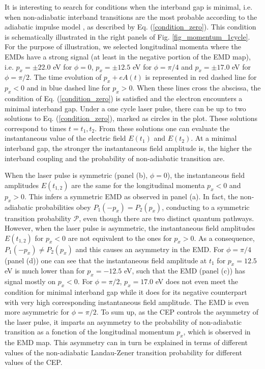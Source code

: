 \documentclass[9pt,twocolumn,twoside]{osajnl}
\begin{document}
It is interesting to search for conditions when the interband gap is minimal, i.e. when non-adiabatic interband transitions are the most probable according to the adiabatic impulse model \cite{PhysRevB.94.125423}, as described by Eq. (\ref{condition_zero}).
This condition is schematically illustrated in the right panels of Fig. \ref{fig_momentum_1cycle}. For the purpose of illustration, we selected longitudinal momenta where the EMDs have a strong signal (at least in the negative portion of the EMD map), i.e.  $p_x=\pm22.0$ eV for $\phi=0$, $p_x=\pm12.5$ eV for $\phi=\pi/4$ and $p_x=\pm17.0$ eV for $\phi=\pi/2$. The  time evolution of  $p_x + e A(t)$ is represented  in red dashed line for $p_x<0$ and in blue dashed line for $p_x>0$.  When these lines cross the abscissa, the condition of Eq. (\ref{condition_zero}) is satisfied and the electron encounters a minimal interband gap. Under a one cycle laser pulse, there can be up to two solutions to Eq. (\ref{condition_zero}), marked as circles in the plot. These solutions correspond to times $t=t_1,t_2$. From these solutions one can evaluate the instantaneous value of the electric field $E(t_1)$ and $E(t_2)$. At a minimal interband gap, the stronger the instantaneous field amplitude is, the higher the interband coupling  and  the probability of non-adiabatic transition are. 

When the laser pulse is symmetric (panel (b), $\phi=0$), the instantaneous field amplitudes $E(t_{1,2})$ are the same for the longitudinal momenta $p_x<0$ and $p_x>0$. This infers a symmetric EMD as observed in panel (a). In fact,  the non-adiabatic probabilities  obey $P_{1}(-p_{x}) = P_{2}(p_{x})$,  conducting to a symmetric transition probability $\mathcal{P}$, even though there are two distinct quantum pathways.
However, when the laser pulse is asymmetric, the instantaneous field amplitudes $E(t_{1,2})$ for $p_x<0$ are not equivalent to the ones for $p_x>0$. As a consequence, $P_{1}(-p_{x}) \neq P_{2}(p_{x})$ and this causes an asymmetry in the EMD. For $\phi=\pi/4$ (panel (d)) one can see that the instantaneous field amplitude at $t_{1}$ for $p_x=12.5$ eV  is much lower than for $p_x=-12.5$ eV, such that the EMD (panel (c)) has signal mostly on $p_x<0$. For $\phi=\pi/2$, $p_x=17.0$ eV does not even meet the condition for minimal interband gap while it does for its negative counterpart with very high corresponding  instantaneous field amplitude. The EMD is even more asymmetric for $\phi=\pi/2$. 
To sum up, as the CEP controls the asymmetry of the laser pulse, it  imparts an asymmetry to the probability of non-adiabatic transition as a fonction of the longitudinal momentum $p_x$, which is observed in the EMD map.
This asymmetry can in turn be explained in terms of different values of the non-adiabatic Landau-Zener transition probability for different values of the CEP.
\end{document}

